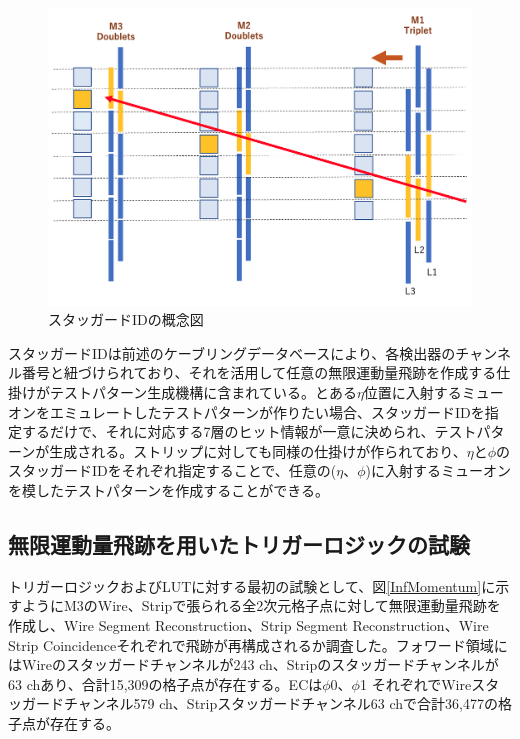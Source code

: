 \begin{figure} 
\centering
\includegraphics[width=16cm]{fig/Test/StaggerdID.png}
\caption[スタッガードIDの概念図]{スタッガードIDの概念図}
\label{StaggerdID}
\end{figure}

スタッガードIDは前述のケーブリングデータベースにより、各検出器のチャンネル番号と紐づけられており、それを活用して任意の無限運動量飛跡を作成する仕掛けがテストパターン生成機構に含まれている。とある$\eta$位置に入射するミューオンをエミュレートしたテストパターンが作りたい場合、スタッガードIDを指定するだけで、それに対応する7層のヒット情報が一意に決められ、テストパターンが生成される。ストリップに対しても同様の仕掛けが作られており、$\eta$と$\phi$のスタッガードIDをそれぞれ指定することで、任意の($\eta$、$\phi$)に入射するミューオンを模したテストパターンを作成することができる。


\subsection{無限運動量飛跡を用いたトリガーロジックの試験}
トリガーロジックおよびLUTに対する最初の試験として、図\ref{InfMomentum}に示すようにM3のWire、Stripで張られる全2次元格子点に対して無限運動量飛跡を作成し、Wire Segment Reconstruction、Strip Segment Reconstruction、Wire Strip Coincidenceそれぞれで飛跡が再構成されるか調査した。フォワード領域にはWireのスタッガードチャンネルが243 ch、Stripのスタッガードチャンネルが63 chあり、合計15,309の格子点が存在する。ECは$\phi$0、$\phi$1 それぞれでWireスタッガードチャンネル579 ch、Stripスタッガードチャンネル63 chで合計36,477の格子点が存在する。

